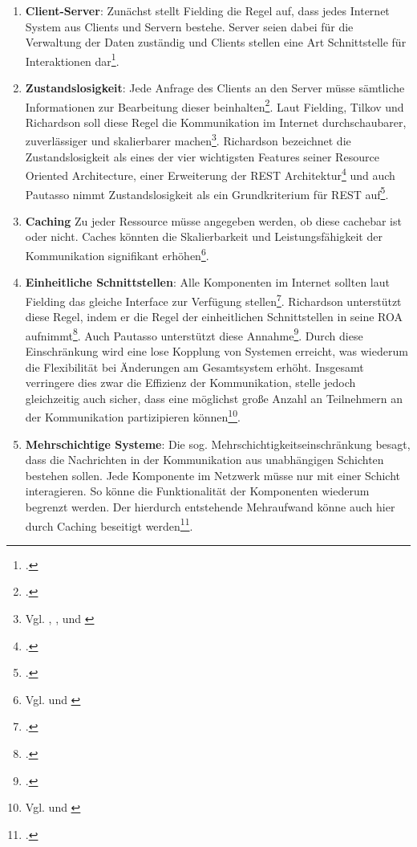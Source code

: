 \begin{enumerate}
    \item \textbf{Client-Server}: Zunächst stellt Fielding die Regel auf, dass jedes Internet System aus Clients und Servern bestehe. Server seien dabei für die Verwaltung der Daten zuständig und Clients stellen eine Art Schnittstelle für Interaktionen dar\footcite[Vgl. ][S. 78]{fielding_architectural_2000}.
    \item \textbf{Zustandslosigkeit}: Jede Anfrage des Clients an den Server müsse sämtliche Informationen zur Bearbeitung dieser beinhalten\footcite[Vgl. ][S. 10]{tilkov_rest_2015}. Laut Fielding, Tilkov und Richardson soll diese Regel die Kommunikation im Internet durchschaubarer, zuverlässiger und skalierbarer machen\footnote{Vgl. \cite[S. 78]{fielding_architectural_2000}, \cite[S. 4]{tilkov_rest_2015}, \cite[S. 119]{tilkov_rest_2015} und \cite[S. 86]{richardson_restful_2007}}. Richardson bezeichnet die Zustandslosigkeit als eines der vier wichtigsten Features seiner Resource Oriented Architecture, einer Erweiterung der REST Architektur\footcite[Vgl. ][S. 86]{richardson_restful_2007} und auch Pautasso nimmt Zustandslosigkeit als ein Grundkriterium für REST auf\footcite[Vgl. ][S. 3]{pautasso_restful_2014}. 
    \item \textbf{Caching} Zu jeder Ressource müsse angegeben werden, ob diese cachebar ist oder nicht. Caches könnten die Skalierbarkeit und Leistungsfähigkeit der Kommunikation signifikant erhöhen\footnote{Vgl. \cite[S. 4]{tilkov_rest_2015} und \cite[S. 127]{tilkov_rest_2015}}.
    \item \textbf{Einheitliche Schnittstellen}: Alle Komponenten im Internet sollten laut Fielding das gleiche Interface zur Verfügung stellen\footcite[Vgl. ][S. 81f]{fielding_architectural_2000}. Richardson unterstützt diese Regel, indem er die Regel der einheitlichen Schnittstellen in seine ROA aufnimmt\footcite[Vgl. ][S. 105]{richardson_restful_2007}. Auch Pautasso unterstützt diese Annahme\footcite[Vgl. ][S. 3]{pautasso_restful_2008}. Durch diese Einschränkung wird eine lose Kopplung von Systemen erreicht, was wiederum die Flexibilität bei Änderungen am Gesamtsystem erhöht. Insgesamt verringere dies zwar die Effizienz der Kommunikation, stelle jedoch gleichzeitig auch sicher, dass eine möglichst große Anzahl an Teilnehmern an der Kommunikation partizipieren können\footnote{Vgl. \cite[S. 2]{tilkov_rest_2015} und \cite[S. 81f]{fielding_architectural_2000}}.
    \item \textbf{Mehrschichtige Systeme}: Die sog. Mehrschichtigkeitseinschränkung besagt, dass die Nachrichten in der Kommunikation aus unabhängigen Schichten bestehen sollen. Jede Komponente im Netzwerk müsse nur mit einer Schicht interagieren. So könne die Funktionalität der Komponenten wiederum begrenzt werden. Der hierdurch entstehende Mehraufwand könne auch hier durch Caching beseitigt werden\footcite[Vgl. ][S. 82f]{fielding_architectural_2000}.

\end{enumerate}
